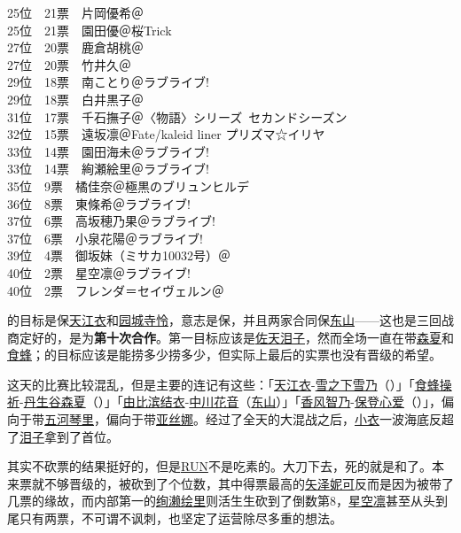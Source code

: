 {    25位　21票　片岡優希＠\Saki\\
    25位　21票　園田優＠桜Trick\\
    27位　20票　鹿倉胡桃＠\Saki\\
    27位　20票　竹井久＠\Saki\\
    29位　18票　南ことり＠ラブライブ!\\
    29位　18票　白井黒子＠\Railgan\\
    31位　17票　千石撫子＠〈物語〉シリーズ~セカンドシーズン\\
    32位　15票　遠坂凛＠Fate/kaleid liner プリズマ☆イリヤ\\
    33位　14票　園田海未＠ラブライブ!\\
    33位　14票　絢瀬絵里＠ラブライブ!\\
    35位　9票　橘佳奈＠極黒のブリュンヒルデ\\
    36位　8票　東條希＠ラブライブ!\\
    37位　6票　高坂穂乃果＠ラブライブ!\\
    37位　6票　小泉花陽＠ラブライブ!\\
    39位　4票　御坂妹（ミサカ10032号）＠\Railgan\\
    40位　2票　星空凛＠ラブライブ!\\
    40位　2票　フレンダ＝セイヴェルン＠\Railgan
}

的目标是保\uline{天江衣}和\uline{园城寺怜}，意志是保，并且两家合同保\uline{东山}——这也是三回战商定好的，是为\textbf{第十次合作}。第一目标应该是\uline{佐天泪子}，然而全场一直在带\uline{森夏}和\uline{食蜂}；的目标应该是能捞多少捞多少，但实际上最后的实票也没有晋级的希望。

这天的比赛比较混乱，但是主要的连记有这些：「\uline{天江衣}-\uline{雪之下雪乃}（）」「\uline{食蜂操祈}-\uline{丹生谷森夏}（）」「\uline{由比滨结衣}-\uline{中川花音}（\uline{东山}）」「\uline{香风智乃}-\uline{保登心爱}（）」，偏向于带\uline{五河琴里}，偏向于带\uline{亚丝娜}。经过了全天的大混战之后，\uline{小衣}一波海底反超了\uline{泪子}拿到了首位。

其实不砍票的结果挺好的，但是\uline{RUN}不是吃素的。大刀下去，死的就是和了。本来票就不够晋级的，被砍到了个位数，其中得票最高的\uline{矢泽妮可}反而是因为被带了几票的缘故，而内部第一的\uline{绚濑绘里}则活生生砍到了倒数第8，\uline{星空凛}甚至从头到尾只有两票，不可谓不讽刺，也坚定了运营除尽多重的想法。

